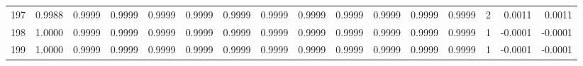 \begin{tabular}{lrrrrrrrrrrrrrrr}
197 &      0.9988 &  0.9999 &  0.9999 &  0.9999 &  0.9999 &  0.9999 &  0.9999 &  0.9999 &  0.9999 &  0.9999 &   0.9999 &     0.9999 &      2 &                    0.0011 &                     0.0011 \\
198 &      1.0000 &  0.9999 &  0.9999 &  0.9999 &  0.9999 &  0.9999 &  0.9999 &  0.9999 &  0.9999 &  0.9999 &   0.9999 &     0.9999 &      1 &                   -0.0001 &                    -0.0001 \\
199 &      1.0000 &  0.9999 &  0.9999 &  0.9999 &  0.9999 &  0.9999 &  0.9999 &  0.9999 &  0.9999 &  0.9999 &   0.9999 &     0.9999 &      1 &                   -0.0001 &                    -0.0001 \\
\bottomrule
\end{tabular}

